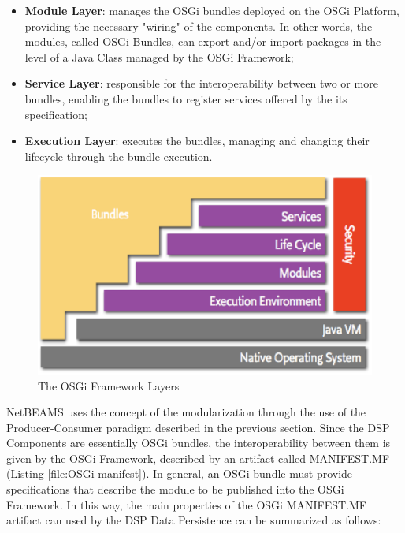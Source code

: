 \begin{itemize}
  \item \textbf{Module Layer}: manages the OSGi bundles deployed on the
  OSGi Platform, providing the necessary "wiring" of the components. In other words,
  the modules, called OSGi Bundles, can export and/or import packages in the
  level of a Java Class managed by the OSGi Framework;
  \item \textbf{Service Layer}: responsible for the interoperability between two
  or more bundles, enabling the bundles to register services offered by
  the its specification;
  \item \textbf{Execution Layer}: executes the bundles, managing and changing
  their lifecycle through the bundle execution.
\end{itemize}

\begin{figure}[!h]
  \centering
  \includegraphics[scale=0.65]{../diagrams/layering-osgi}
  \caption{The OSGi Framework Layers}
  \label{fig:layering-osgi}
\end{figure}

NetBEAMS uses the concept of the modularization through the use of the
Producer-Consumer paradigm described in the previous section. Since the DSP
Components are essentially OSGi bundles, the interoperability between
them is given by the OSGi Framework, described by an artifact called
MANIFEST.MF (Listing \ref{file:OSGi-manifest}). In general, an OSGi bundle must
provide specifications that describe the module to be published into the OSGi
Framework. In this way, the main properties of the OSGi MANIFEST.MF artifact
can used by the DSP Data Persistence can be summarized as follows:

